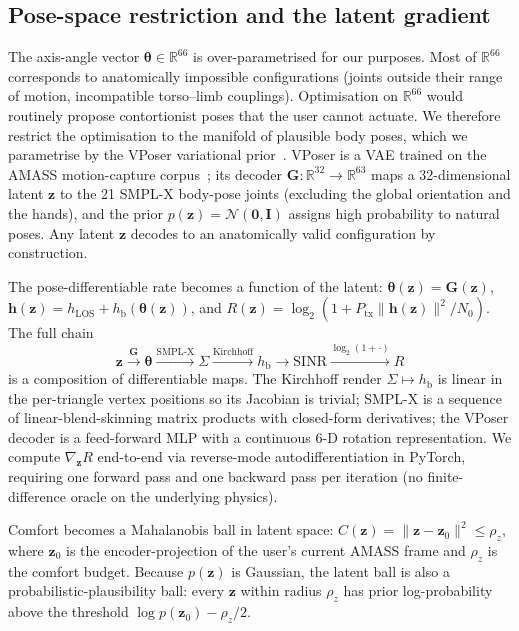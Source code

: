 \documentclass[journal,twocolumn,10pt]{IEEEtran}
\theoremstyle{plain}
\theoremstyle{definition}
\theoremstyle{remark}
\newcommand{\hh}{\mathbf{h}}
\newcommand{\thetab}{\bm{\theta}}
\newcommand{\hLOS}{h_{\mathrm{LOS}}}
\newcommand{\hbody}{h_{\mathrm{b}}}
\newcommand{\Reals}{\mathbb{R}}
\begin{document}
\subsection{Pose-space restriction and the latent gradient}\label{sec:vposer-latent}

The axis-angle vector $\thetab \in \Reals^{66}$ is over-parametrised
for our purposes. Most of $\Reals^{66}$ corresponds to anatomically
impossible configurations (joints outside their range of motion,
incompatible torso--limb couplings). Optimisation on $\Reals^{66}$
would routinely propose contortionist poses that the user cannot
actuate. We therefore restrict the optimisation to the manifold of
plausible body poses, which we parametrise by the VPoser variational
prior~\cite{Pavlakos2019VPoser}. VPoser is a VAE trained on the AMASS
motion-capture corpus~\cite{AMASS2019}; its decoder
$\bm{G}: \Reals^{32} \to \Reals^{63}$ maps a 32-dimensional latent
$\bm{z}$ to the 21 SMPL-X body-pose joints (excluding the global
orientation and the hands), and the prior $p(\bm{z}) = \mathcal{N}(\bm{0},
\bm{I})$ assigns high probability to natural poses. Any latent
$\bm{z}$ decodes to an anatomically valid configuration by
construction.

The pose-differentiable rate becomes a function of the latent:
$\thetab(\bm{z}) = \bm{G}(\bm{z})$,
$\hh(\bm{z}) = \hLOS + \hbody(\thetab(\bm{z}))$, and
$R(\bm{z}) = \log_2(1 + P_{\mathrm{tx}}\|\hh(\bm{z})\|^{2}/N_0)$.
The full chain
\begin{equation}\label{eq:autodiff-chain}
\bm{z} \xrightarrow{\bm{G}} \thetab \xrightarrow{\mathrm{SMPL\text{-}X}}
\Sigma \xrightarrow{\mathrm{Kirchhoff}} \hbody \xrightarrow{}
\mathrm{SINR} \xrightarrow{\log_2(1 + \cdot)} R
\end{equation}
is a composition of differentiable maps. The Kirchhoff render
$\Sigma \mapsto \hbody$ is linear in the per-triangle vertex
positions so its Jacobian is trivial; SMPL-X is a sequence of
linear-blend-skinning matrix products with closed-form derivatives;
the VPoser decoder is a feed-forward MLP with a continuous
6-D rotation representation. We compute $\nabla_{\bm{z}} R$ end-to-end
via reverse-mode autodifferentiation in PyTorch, requiring one
forward pass and one backward pass per iteration (no finite-difference
oracle on the underlying physics).

Comfort becomes a Mahalanobis ball in latent space:
$C(\bm{z}) = \|\bm{z} - \bm{z}_0\|^{2} \leq \rho_z$, where $\bm{z}_0$
is the encoder-projection of the user's current AMASS frame and
$\rho_z$ is the comfort budget. Because $p(\bm{z})$ is Gaussian,
the latent ball is also a probabilistic-plausibility ball: every
$\bm{z}$ within radius $\rho_z$ has prior log-probability above
the threshold $\log p(\bm{z}_0) - \rho_z/2$.
\end{document}
